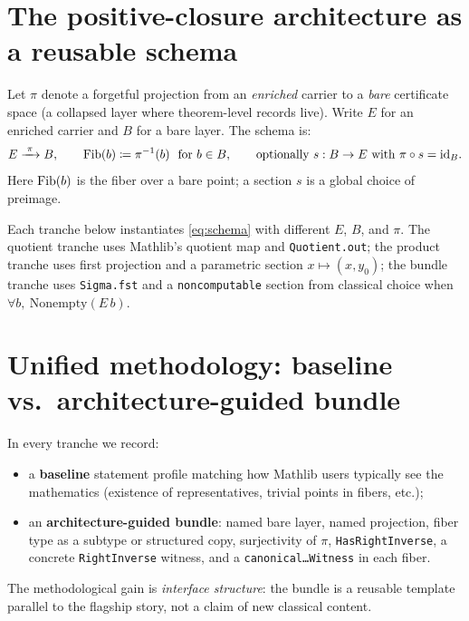 \documentclass[11pt]{article}
\begin{document}

\section{The positive-closure architecture as a reusable schema}\label{sec:schema}

Let $\pi$ denote a forgetful projection from an \emph{enriched} carrier to a \emph{bare}
certificate space (a collapsed layer where theorem-level records live). Write $E$ for an
enriched carrier and $B$ for a bare layer. The schema is:
\begin{equation}\label{eq:schema}
E \xrightarrow{\;\pi\;} B,
\qquad
\mathrm{Fib}(b) \coloneqq \pi^{-1}(b)\ \text{ for } b\in B,
\qquad
\text{optionally } s : B \to E \text{ with } \pi \circ s = \mathrm{id}_B.
\end{equation}
Here $\mathrm{Fib}(b)$ is the fiber over a bare point; a section $s$ is a global choice of preimage.

Each tranche below instantiates \eqref{eq:schema} with different $E$, $B$, and $\pi$. The
quotient tranche uses Mathlib's quotient map and \texttt{Quotient.out}; the product tranche
uses first projection and a parametric section $x \mapsto (x,y_0)$; the bundle tranche uses
\texttt{Sigma.fst} and a \texttt{noncomputable} section from classical choice when
$\forall b,\ \mathrm{Nonempty}(E\,b)$.

\section{Unified methodology: baseline vs.\ architecture-guided bundle}\label{sec:method}

In every tranche we record:
\begin{itemize}[leftmargin=2em]
  \item a \textbf{baseline} statement profile matching how Mathlib users typically see the
    mathematics (existence of representatives, trivial points in fibers, etc.);
  \item an \textbf{architecture-guided bundle}: named bare layer, named projection, fiber
    type as a subtype or structured copy, surjectivity of $\pi$, \texttt{HasRightInverse},
    a concrete \texttt{RightInverse} witness, and a \texttt{canonical\ldots Witness} in
    each fiber.
\end{itemize}
The methodological gain is \emph{interface structure}: the bundle is a reusable template
parallel to the flagship story, not a claim of new classical content.
\end{document}
